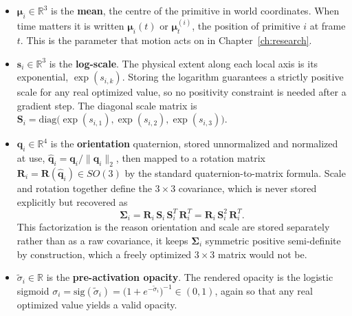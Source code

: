 \begin{itemize}
    \item $\boldsymbol{\mu}_i \in \mathbb{R}^3$ is the \textbf{mean}, the centre
    of
    the primitive in world coordinates. When time matters it is written
    $\boldsymbol{\mu}_i(t)$ or $\boldsymbol{\mu}^{(i)}_t$, the position of
    primitive
    $i$ at frame $t$. This is the parameter that motion acts on in
    Chapter~\ref{ch:research}.

    \item $\mathbf{s}_i \in \mathbb{R}^3$ is the \textbf{log-scale}. The physical
    extent along each local axis is its exponential, $\exp(s_{i,k})$. Storing the
    logarithm guarantees a strictly positive scale for any real optimized value,
    so
    no positivity constraint is needed after a gradient step. The diagonal scale
    matrix is $\mathbf{S}_i = \mathrm{diag}\!\big(\exp(s_{i,1}), \exp(s_{i,2}),
    \exp(s_{i,3})\big)$.

    \item $\mathbf{q}_i \in \mathbb{R}^4$ is the \textbf{orientation} quaternion,
    stored unnormalized and normalized at use, $\hat{\mathbf{q}}_i =
    \mathbf{q}_i /
    \|\mathbf{q}_i\|_2$, then mapped to a rotation matrix $\mathbf{R}_i =
    \mathbf{R}(\hat{\mathbf{q}}_i) \in SO(3)$ by the standard quaternion-to-matrix
    formula. Scale and rotation together define the $3\times3$ covariance, which
    is
    never stored explicitly but recovered as
    \begin{equation}
        \boldsymbol{\Sigma}_i = \mathbf{R}_i\, \mathbf{S}_i\, \mathbf{S}_i^T\, \mathbf{R}_i^T
        = \mathbf{R}_i\, \mathbf{S}_i^2\, \mathbf{R}_i^T.
        \label{eq:cov}
    \end{equation}
    This factorization is the reason orientation and scale are stored separately
    rather than as a raw covariance, it keeps $\boldsymbol{\Sigma}_i$ symmetric
    positive semi-definite by construction, which a freely optimized $3\times3$
    matrix would not be.

    \item $\tilde\sigma_i \in \mathbb{R}$ is the \textbf{pre-activation opacity}.
    The rendered opacity is the logistic sigmoid
    $\sigma_i = \mathrm{sig}(\tilde\sigma_i) = \big(1 +
    e^{-\tilde\sigma_i}\big)^{-1}
    \in (0,1)$, again so that any real optimized value yields a valid opacity.


\end{itemize}
